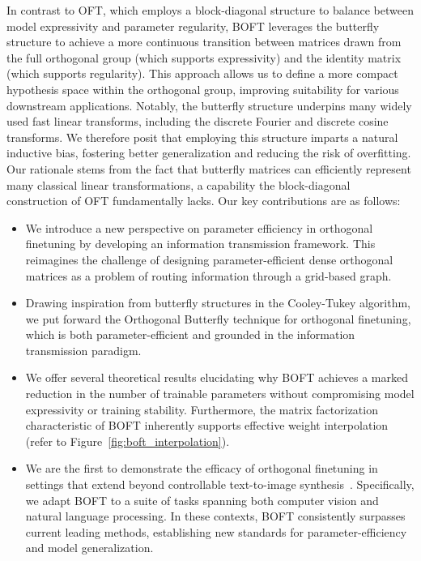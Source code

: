 In contrast to OFT, which employs a block-diagonal structure to balance between model expressivity and parameter regularity, BOFT leverages the butterfly structure to achieve a more continuous transition between matrices drawn from the full orthogonal group (which supports expressivity) and the identity matrix (which supports regularity). This approach allows us to define a more compact hypothesis space within the orthogonal group, improving suitability for various downstream applications. Notably, the butterfly structure underpins many widely used fast linear transforms, including the discrete Fourier and discrete cosine transforms. We therefore posit that employing this structure imparts a natural inductive bias, fostering better generalization and reducing the risk of overfitting. Our rationale stems from the fact that butterfly matrices can efficiently represent many classical linear transformations, a capability the block-diagonal construction of OFT fundamentally lacks. Our key contributions are as follows:

\begin{itemize}[leftmargin=*,nosep]
    \item We introduce a new perspective on parameter efficiency in orthogonal finetuning by developing an information transmission framework. This reimagines the challenge of designing parameter-efficient dense orthogonal matrices as a problem of routing information through a grid-based graph.
    \item Drawing inspiration from butterfly structures in the Cooley-Tukey algorithm, we put forward the Orthogonal Butterfly technique for orthogonal finetuning, which is both parameter-efficient and grounded in the information transmission paradigm.
    \item We offer several theoretical results elucidating why BOFT achieves a marked reduction in the number of trainable parameters without compromising model expressivity or training stability. Furthermore, the matrix factorization characteristic of BOFT inherently supports effective weight interpolation (refer to Figure~\ref{fig:boft_interpolation}).
    \item We are the first to demonstrate the efficacy of orthogonal finetuning in settings that extend beyond controllable text-to-image synthesis~\cite{qiu2023controlling}. Specifically, we adapt BOFT to a suite of tasks spanning both computer vision and natural language processing. In these contexts, BOFT consistently surpasses current leading methods, establishing new standards for parameter-efficiency and model generalization.
\end{itemize}

